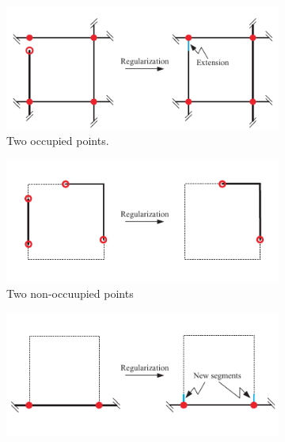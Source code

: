 \begin{figure}[h]
	\centering
	\begin{subfigure}[t]{0.45\textwidth}
		\centering
		\includegraphics[width=\textwidth]{images/tri_dexel_regularization_1}
		\caption{Two occupied points.}
		\label{fig:tri_dexel_regularization_1}
	\end{subfigure}
	\begin{subfigure}[t]{0.45\textwidth}
		\centering
		\includegraphics[width=\textwidth]{images/tri_dexel_regularization_2}
		\caption{Two non-occuupied points}
		\label{fig:tri_dexel_regularization_2}
	\end{subfigure}
	\begin{subfigure}[t]{0.45\textwidth}
		\centering
		\includegraphics[width=\textwidth]{images/tri_dexel_regularization_3}

\end{subfigure}
\end{figure}
